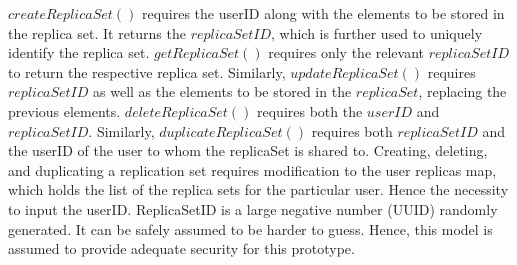 \documentclass[conference]{IEEEtran}
\begin{document}
$createReplicaSet()$ requires the userID along with the elements to be stored in the replica set. It returns the $replicaSetID$, which is further used to uniquely identify the replica set. $getReplicaSet()$ requires only the relevant $replicaSetID$ to return the respective replica set. Similarly, $updateReplicaSet()$ requires $replicaSetID$ as well as the elements to be stored in the $replicaSet$, replacing the previous elements. $deleteReplicaSet()$ requires both the $userID$ and $replicaSetID$. Similarly, $duplicateReplicaSet()$ requires both $replicaSetID$ and the userID of the user to whom the replicaSet is shared to. Creating, deleting, and duplicating a replication set requires modification to the user replicas map, which holds the list of the replica sets for the particular user. Hence the necessity to input the userID. ReplicaSetID is a large negative number (UUID) randomly generated. It can be safely assumed to be harder to guess. Hence, this model is assumed to provide adequate security for this prototype.
\end{document}
